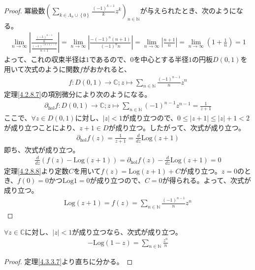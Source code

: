 \documentclass[dvipdfmx]{jsarticle}
\begin{document}
\begin{proof}
冪級数$\left( \sum_{k \in \varLambda_{n} \cup \left\{ 0 \right\}} {\frac{( - 1)^{k - 1}}{k}z^{k}} \right)_{n \in \mathbb{N}}$が与えられたとき、次のようになる。
\begin{align*}
\lim_{n \rightarrow \infty}\left| \frac{\frac{( - 1)^{n - 1}}{n}}{\frac{( - 1)^{(n + 1) - 1}}{n + 1}} \right| = \lim_{n \rightarrow \infty}\left| \frac{- ( - 1)^{n}(n + 1)}{( - 1)^{n}n} \right| = \lim_{n \rightarrow \infty}\left| \frac{n + 1}{n} \right| = \lim_{n \rightarrow \infty}\left( 1 + \frac{1}{n} \right) = 1
\end{align*}
よって、これの収束半径は$1$であるので、$0$を中心とする半径$1$の円板$D(0,1)$を用いて次式のように関数$f$がおかれると、
\begin{align*}
f:D(0,1) \rightarrow \mathbb{C};z \mapsto \sum_{n \in \mathbb{N}} {\frac{( - 1)^{n - 1}}{n}z^{n}}
\end{align*}
定理\ref{4.2.8.7}の項別微分により次のようになる。
\begin{align*}
\partial_{\mathrm{hol}}f:D(0,1) \rightarrow \mathbb{C};z \mapsto \sum_{n \in \mathbb{N}} {( - 1)^{n - 1}z^{n - 1}} = \frac{1}{z + 1}
\end{align*}
ここで、$\forall z \in D(0,1)$に対し、$|z| < 1$が成り立つので、$0 \leq |z + 1| \leq |z| + 1 < 2$が成り立つことにより、$z + 1 \in D$が成り立つ。したがって、次式が成り立つ。
\begin{align*}
\partial_{\mathrm{hol}}f(z) = \frac{1}{z + 1} = \frac{d}{dz}\mathrm{Log}(z + 1)
\end{align*}
即ち、次式が成り立つ。
\begin{align*}
\frac{d}{dz}\left( f(z) - \mathrm{Log}(z + 1) \right) = \partial_{\mathrm{hol}}f(z) - \frac{d}{dz}\mathrm{Log}(z + 1) = 0
\end{align*}
定理\ref{4.2.8.8}より定数$C$を用いて$f(z) = \mathrm{Log}(z + 1) + C$が成り立つ。$z = 0$のとき、$f(0) = 0$かつ$\mathrm{Log}1 = 0$が成り立つので、$C = 0$が得られる。よって、次式が成り立つ。
\begin{align*}
\mathrm{Log}(z + 1) = f(z) = \sum_{n \in \mathbb{N}} {\frac{( - 1)^{n - 1}}{n}z^{n}}
\end{align*}
\end{proof}
\begin{thm}\label{4.3.3.8}
$\forall z \in \mathbb{C}$に対し、$|z| < 1$が成り立つなら、次式が成り立つ。
\begin{align*}
- \mathrm{Log}(1 - z) = \sum_{n \in \mathbb{N}} \frac{z^{n}}{n}
\end{align*}
\end{thm}
\begin{proof} 定理\ref{4.3.3.7}より直ちに分かる。
\end{proof}
\end{document}
